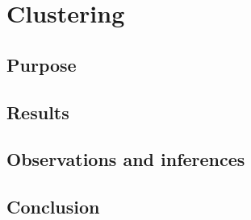\section{Clustering}

\todo

\subsection*{Purpose}

\todo

\subsection*{Results}

\todo

\subsection*{Observations and inferences}

\todo

\subsection*{Conclusion}

\todo